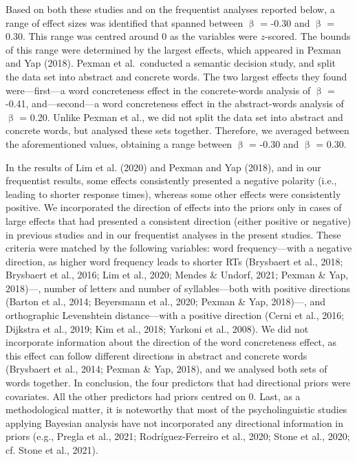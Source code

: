\documentclass[
  12pt,
  man,floatsintext]{apa7}
\begin{document}
Based on both these studies and on the frequentist analyses reported below, a range of effect sizes was identified that spanned between \(\upbeta\) = -0.30 and \(\upbeta\) = 0.30. This range was centred around 0 as the variables were \(z\)-scored. The bounds of this range were determined by the largest effects, which appeared in Pexman and Yap (2018). Pexman et al.~conducted a semantic decision study, and split the data set into abstract and concrete words. The two largest effects they found were---first---a word concreteness effect in the concrete-words analysis of \(\upbeta\) = -0.41, and---second---a word concreteness effect in the abstract-words analysis of \(\upbeta\) = 0.20. Unlike Pexman et al., we did not split the data set into abstract and concrete words, but analysed these sets together. Therefore, we averaged between the aforementioned values, obtaining a range between \(\upbeta\) = -0.30 and \(\upbeta\) = 0.30.

In the results of Lim et al. (2020) and Pexman and Yap (2018), and in our frequentist results, some effects consistently presented a negative polarity (i.e., leading to shorter response times), whereas some other effects were consistently positive. We incorporated the direction of effects into the priors only in cases of large effects that had presented a consistent direction (either positive or negative) in previous studies and in our frequentist analyses in the present studies. These criteria were matched by the following variables: word frequency---with a negative direction, as higher word frequency leads to shorter RTs (Brysbaert et al., 2018; Brysbaert et al., 2016; Lim et al., 2020; Mendes \& Undorf, 2021; Pexman \& Yap, 2018)---, number of letters and number of syllables---both with positive directions (Barton et al., 2014; Beyersmann et al., 2020; Pexman \& Yap, 2018)---, and orthographic Levenshtein distance---with a positive direction (Cerni et al., 2016; Dijkstra et al., 2019; Kim et al., 2018; Yarkoni et al., 2008). We did not incorporate information about the direction of the word concreteness effect, as this effect can follow different directions in abstract and concrete words (Brysbaert et al., 2014; Pexman \& Yap, 2018), and we analysed both sets of words together. In conclusion, the four predictors that had directional priors were covariates. All the other predictors had priors centred on 0. Last, as a methodological matter, it is noteworthy that most of the psycholinguistic studies applying Bayesian analysis have not incorporated any directional information in priors (e.g., Pregla et al., 2021; Rodríguez-Ferreiro et al., 2020; Stone et al., 2020; cf. Stone et al., 2021).
\end{document}
